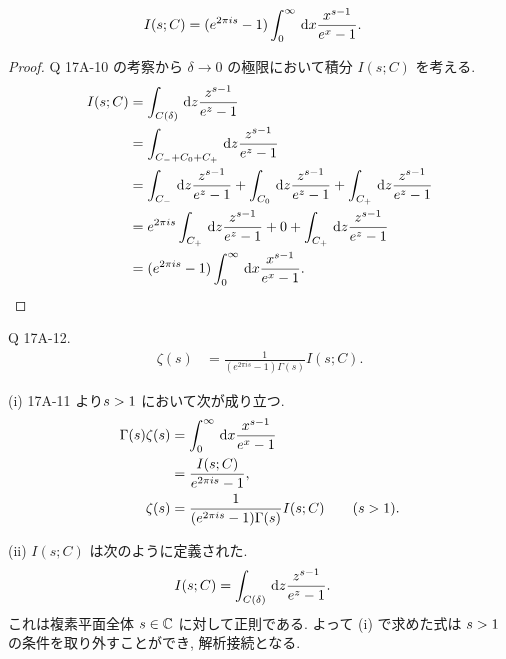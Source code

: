 \documentclass[uplatex,diffipdfmx,a4paper,11pt]{jlreq}
\begin{document}
\begin{proposition}
  \begin{align}
    I(s; C) & = (e^{2\pi is} - 1)\int_0^\infty\dl{x}\frac{x^{s-1}}{e^x - 1}.
  \end{align}
\end{proposition}
\begin{proof}
  Q 17A-10 の考察から $\delta\to 0$ の極限において積分 $I(s; C)$ を考える.
  \begin{align}
    I(s; C) & = \int_{C(\delta)}\dl{z}\frac{z^{s-1}}{e^z - 1}                                                                               \\
            & = \int_{C_- + C_0 + C_+}\dl{z}\frac{z^{s-1}}{e^z - 1}                                                                         \\
            & = \int_{C_-}\dl{z}\frac{z^{s-1}}{e^z - 1} + \int_{C_0}\dl{z}\frac{z^{s-1}}{e^z - 1} + \int_{C_+}\dl{z}\frac{z^{s-1}}{e^z - 1} \\
            & = e^{2\pi is}\int_{C_+}\dl{z}\frac{z^{s-1}}{e^z - 1} + 0 + \int_{C_+}\dl{z}\frac{z^{s-1}}{e^z - 1}                            \\
            & = (e^{2\pi is} - 1)\int_{0}^\infty\dl{x}\frac{x^{s-1}}{e^x - 1}.
  \end{align}
\end{proof}

\begin{itembox}[l]{Q 17A-12.}
  \begin{align}
    \zeta(s) & = \frac{1}{(e^{2\pi is} - 1)\Gamma(s)}I(s; C).
  \end{align}
\end{itembox}

(i) 17A-11 より$\real s > 1$ において次が成り立つ.
\begin{align}
  \Gamma(s)\zeta(s) & = \int_0^\infty\dl{x}\frac{x^{s-1}}{e^x - 1}                        \\
                    & = \frac{I(s; C)}{e^{2\pi is} - 1},                                  \\
  \zeta(s)          & = \frac{1}{(e^{2\pi is} - 1)\Gamma(s)}I(s; C) \qquad (\real s > 1).
\end{align}

(ii)
$I(s; C)$ は次のように定義された.
\begin{align}
  I(s; C) & = \int_{C(\delta)}\dl{z}\frac{z^{s-1}}{e^z - 1}.
\end{align}
これは複素平面全体 $s\in\mathbb{C}$ に対して正則である. よって (i) で求めた式は $\real s > 1$ の条件を取り外すことができ, 解析接続となる.
\end{document}
